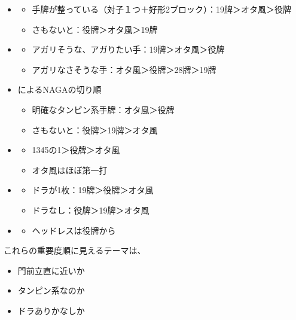 \documentclass[../nankiru_main.tex]{subfiles}
\begin{document}
\begin{itemize}
  \item \citet{senba-yakuhai}
  \begin{itemize}
    \item 手牌が整っている（対子１つ＋好形2ブロック）：19牌＞オタ風＞役牌
    \item さもないと：役牌＞オタ風＞19牌
  \end{itemize}
  \item \citet{tsuchida-yakuhai}
  \begin{itemize}
    \item アガリそうな、アガりたい手：19牌＞オタ風＞役牌
    \item アガリなさそうな手：オタ風＞役牌＞28牌＞19牌
  \end{itemize}
  \item \citet{naga-yakuhai}によるNAGAの切り順
  \begin{itemize}
    \item 明確なタンピン系手牌：オタ風＞役牌
    \item さもないと：役牌＞19牌＞オタ風
  \end{itemize}
  \item \citet{shibukawa-yakuhai}
  \begin{itemize}
    \item 1345の1＞役牌＞オタ風
    \item オタ風はほぼ第一打
  \end{itemize}
  \item \citet{yoteru-yakuhai}
  \begin{itemize}
    \item ドラが1枚：19牌＞役牌＞オタ風
    \item ドラなし：役牌＞19牌＞オタ風
  \end{itemize}
  \item \citet{chigo-yakuhai}
  \begin{itemize}
    \item ヘッドレスは役牌から
  \end{itemize}
\end{itemize}

これらの重要度順に見えるテーマは、

\begin{itemize}
  \item 門前立直に近いか
  \item タンピン系なのか
  \item ドラありかなしか
\end{itemize}
\end{document}
